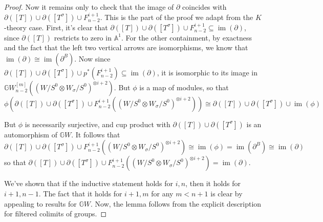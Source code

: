 \documentclass[edeposit,fullpage]{uiucthesis2009}
\newcommand{\mbb}{\mathbb}
\DeclareMathOperator*{\im}{im}
\theoremstyle{plain}
\numberwithin{lemma}{section}
\theoremstyle{definition}
\begin{document}
\begin{proof}
Now it remains only to
check that the image of $\partial$ coincides with
$\partial([T]) \cup \partial([T^\sigma]) \cup
F^{i+1}_{n-2}$. This is the part of the proof we adapt from the
$K$-theory case. First, it's clear that $\partial([T]) \cup \partial([T^\sigma]) \cup
F^{i+1}_{n-2} \subseteq \im(\partial)$, since $\partial([T])$
restricts to zero in $\mbb A^1$. For the other containment, by
exactness and the fact that the left two vertical arrows are
isomorphisms, we know that $\im(\partial) \cong
\im(\partial^B)$. Now since $\partial([T]) \cup \partial([T^\sigma]) \cup
p^*(F^{i+1}_{n-2}) \subseteq \im(\partial)$, it is isomorphic to its
image in $\mbb GW^{[m]}_{n-2}((W/S^0 \otimes W_\sigma/S^0)^{\otimes
  i+2})$. But $\phi$ is a map of modules, so that 
\[
\phi(\partial([T]) \cup \partial([T^\sigma]) \cup
F^{i+1}_{n-2}((W/S^0 \otimes W_\sigma/S^0)^{\otimes i+2})) \cong \partial([T]) \cup \partial([T^\sigma]) \cup \im(\phi)
\] 

But $\phi$ is necessarily surjective, and cup product with
$ \partial([T]) \cup \partial([T^\sigma])$ is an automorphism of $\mbb
GW$. It follows that 
\[
\partial([T]) \cup \partial([T^\sigma]) \cup
F^{i+1}_{n-2}((W/S^0 \otimes W_\sigma/S^0)^{\otimes i+2}) \cong \im
(\phi) = \im(\partial^B) \cong \im(\partial)
\]
so that $\partial([T]) \cup \partial([T^\sigma]) \cup
F^{i+1}_{n-2}((W/S^0 \otimes W_\sigma/S^0)^{\otimes i+2}) =
\im(\partial)$. 

We've shown that if the inductive statement holds for $i,n$,
then it holds for $i+1,n-1$. The fact that it holds for $i+1,m$ for
any $m < n+1$ is
clear by appealing to results for $\mbb GW$. Now, the lemma follows from the explicit description for filtered
colimits of groups.











\end{proof}
\end{document}

